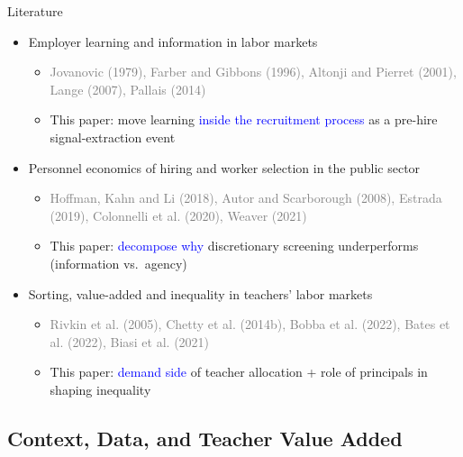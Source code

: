 \documentclass[compress,10pt,aspectratio=169]{beamer}
\newcommand\emphblue[1]{\textcolor{blue}{#1}}
\begin{document}
\begin{frame}{Literature}
    \begin{itemize}
        \item Employer learning and information in labor markets
        \begin{itemize}
       \smallskip
        \item[$\Rightarrow$] {\footnotesize \textcolor{gray}{Jovanovic (1979), Farber and Gibbons (1996), Altonji and Pierret (2001), Lange (2007), Pallais (2014)}}
        \medskip
            \item[$\Rightarrow$] This paper: move learning \emphblue{inside the recruitment process} as a pre-hire signal-extraction event
        \end{itemize}
    \bigskip
        \item Personnel economics of hiring and worker selection in the public sector
\begin{itemize}
\smallskip
    \item[$\Rightarrow$] {\footnotesize \textcolor{gray}{Hoffman, Kahn and Li (2018), Autor and Scarborough (2008), Estrada (2019), Colonnelli et al. (2020), Weaver (2021)}}
    \medskip
    \item[$\Rightarrow$] This paper: \emphblue{decompose why} discretionary screening underperforms (information vs.\ agency)
    \end{itemize}
    \bigskip
    \item Sorting, value-added and inequality in teachers' labor markets
    \begin{itemize}
\smallskip
    \item[$\Rightarrow$] {\footnotesize \textcolor{gray}{Rivkin et al. (2005), Chetty et al. (2014b), Bobba et al. (2022), Bates et al. (2022), Biasi et al. (2021)}}
        \medskip
    \item[$\Rightarrow$] This paper: \emphblue{demand side} of teacher allocation + role of principals in shaping inequality
\end{itemize}
    \end{itemize}
\end{frame}

\subsection{Context, Data, and Teacher Value Added}
\end{document}
